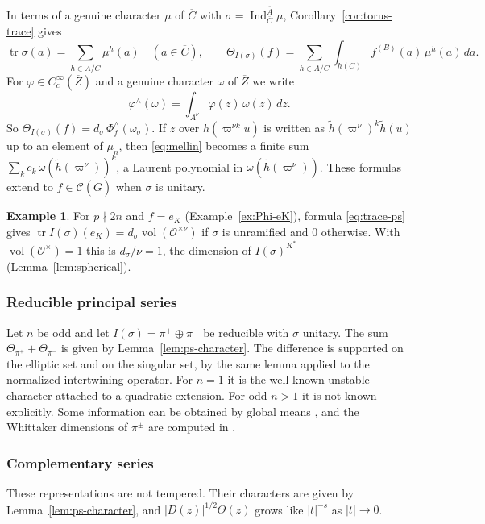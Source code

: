 \documentclass[12pt,letterpaper]{article}
\numberwithin{equation}{section}
\theoremstyle{definition}
\newtheorem{xexample}[theorem]{Example}
\newcommand{\OF}{\mathcal O}
\newcommand{\vp}{\varpi}
\newcommand{\bG}{\overline{G}}
\newcommand{\bA}{\overline{A}}
\newcommand{\bC}{\overline{C}}
\newcommand{\bZ}{\overline{Z}}
\newcommand{\hl}{\tilde h}
\newcommand{\calC}{\mathcal C}
\DeclareMathOperator{\tr}{tr}
\DeclareMathOperator{\Ind}{Ind}
\DeclareMathOperator{\vol}{vol}
\begin{document}
In terms of a genuine character $\mu$ of $\bC$ with $\sigma=\Ind_{\bC}^{\bA}\mu$,
Corollary~\ref{cor:torus-trace} gives
\begin{equation}\label{eq:trace-mu}
\tr\sigma(a)=\sum_{h\in\bA/\bC}\mu^h(a)\quad(a\in\bC),\qquad
\Theta_{I(\sigma)}(f)=\sum_{h\in\bA/\bC}\int_{h(C)}f^{(B)}(a)\,\mu^h(a)\,da .
\end{equation}
For $\varphi\in C_c^\infty(\bZ)$ and a genuine character $\omega$ of $\bZ$ we write
\begin{equation}\label{eq:mellin}
\varphi^\wedge(\omega)=\int_{A^\nu}\varphi(z)\,\omega(z)\,dz .
\end{equation}
So $\Theta_{I(\sigma)}(f)=d_\sigma\,\Phi_f^\wedge(\omega_\sigma)$.  If $z$ over
$h(\vp^{\nu k}u)$ is written as $\hl(\vp^\nu)^k\hl(u)$ up to an element of $\mu_n$, then
\eqref{eq:mellin} becomes a finite sum $\sum_kc_k\,\omega(\hl(\vp^\nu))^k$, a Laurent
polynomial in $\omega(\hl(\vp^\nu))$.  These formulas extend to $f\in\calC(\bG)$ when $\sigma$
is unitary.

\begin{xexample}\label{ex:trace-eK}
For $p\nmid2n$ and $f=e_K$ (Example~\ref{ex:Phi-eK}), formula \eqref{eq:trace-ps} gives
$\tr I(\sigma)(e_K)=d_\sigma\vol(\OF^{\times\nu})$ if $\sigma$ is unramified and $0$ otherwise.
With $\vol(\OF^\times)=1$ this is $d_\sigma/\nu=1$, the dimension of $I(\sigma)^{K^*}$
(Lemma~\ref{lem:spherical}).
\end{xexample}

\subsubsection{Reducible principal series}
Let $n$ be odd and let $I(\sigma)=\pi^+\oplus\pi^-$ be reducible with $\sigma$ unitary.  The
sum $\Theta_{\pi^+}+\Theta_{\pi^-}$ is given by Lemma~\ref{lem:ps-character}.  The difference
is supported on the elliptic set and on the singular set, by the same lemma applied to the
normalized intertwining operator.  For $n=1$ it is the well-known unstable character
attached to a quadratic extension.  For odd $n>1$ it is not known explicitly.  Some
information can be obtained by global means \cite{Jo88,Fl80}, and the Whittaker dimensions
of $\pi^\pm$ are computed in \cite{Sz24}.

\subsubsection{Complementary series}
These representations are not tempered.  Their characters are given by
Lemma~\ref{lem:ps-character}, and $|D(z)|^{1/2}\Theta(z)$ grows like $|t|^{-s}$ as
$|t|\to0$.
\end{document}

